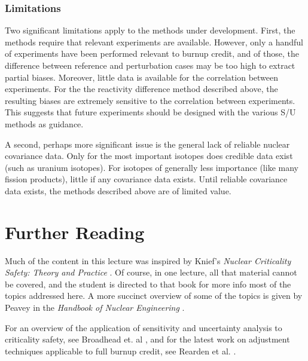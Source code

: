 \subsubsection{Limitations}

Two significant limitations apply to the methods under development.  First,
the methods require that relevant experiments are available.  However,
only a handful of experiments have been performed relevant to burnup credit,
and of those, the difference between reference and perturbation cases may 
be too high to extract partial biases.  Moreover, little data is available
for the correlation between experiments.  For the the reactivity difference
method described above, the resulting biases are extremely sensitive to 
the correlation between experiments. This suggests that future 
experiments should be designed with the various S/U methods as guidance.

A second, perhaps more significant issue is the general lack of reliable
nuclear covariance data.  Only for the most important isotopes does credible
data exist (such as uranium isotopes).  For isotopes of generally less
importance (like many fission products), little if any covariance data
exists.  Until reliable covariance data exists, the methods described
above are of limited value.
 
\section{Further Reading}

Much of the content in this lecture was inspired by Knief's 
\textit{Nuclear Criticality Safety: Theory and Practice} \cite{knief}.  Of
course, in one lecture, all that material cannot be covered, and the student
is directed to that book for more info most of the topics addressed here.
A more succinct overview of some of the topics is given by 
Peavey
in the \textit{Handbook of Nuclear Engineering} \cite{handbook}.  

For an overview of the application of sensitivity and uncertainty analysis
to criticality safety, see Broadhead et. al \cite{broadhead2004sau}, and
for the latest work on adjustment techniques applicable to full burnup
credit, see Rearden et al. \cite{reardenNT}.